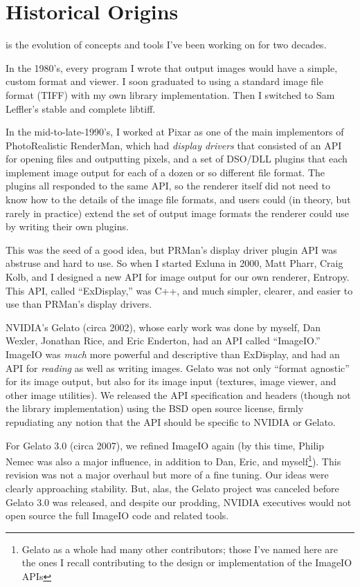 \section{Historical Origins}

\product is the evolution of concepts and tools I've been working on 
for two decades.

In the 1980's, every program I wrote that output images would have a
simple, custom format and viewer.  I soon graduated to using a standard
image file format (TIFF) with my own library implementation.  Then I
switched to Sam Leffler's stable and complete {\fn libtiff}.

In the mid-to-late-1990's, I worked at Pixar as one of the main
implementors of PhotoRealistic RenderMan, which had \emph{display
  drivers} that consisted of an API for opening files and outputting
pixels, and a set of DSO/DLL plugins that each implement image output
for each of a dozen or so different file format.  The plugins all
responded to the same API, so the renderer itself did not need to know
how to the details of the image file formats, and users could (in
theory, but rarely in practice) extend the set of output image formats
the renderer could use by writing their own plugins.

This was the seed of a good idea, but PRMan's display driver plugin API
was abstruse and hard to use.  So when I started Exluna in 2000, Matt
Pharr, Craig Kolb, and I designed a new API for image output for our own
renderer, Entropy.  This API, called ``ExDisplay,'' was C++, and much
simpler, clearer, and easier to use than PRMan's display drivers.

NVIDIA's Gelato (circa 2002), whose early work was done by myself, Dan
Wexler, Jonathan Rice, and Eric Enderton, had an API
called ``ImageIO.''  ImageIO was 
\emph{much} more powerful and descriptive than ExDisplay, and had an
API for \emph{reading} as well as writing images.  Gelato was not only
``format agnostic'' for its image output, but also for its
image input (textures, image viewer, and other image utilities).
We released the API specification and headers (though not the
library implementation) using the BSD open source license, firmly
repudiating any notion that the API should be specific to NVIDIA or
Gelato.

For Gelato 3.0 (circa 2007), we refined ImageIO again (by this time,
Philip Nemec was also a major influence, in addition to Dan, Eric, and
myself\footnote{Gelato as a whole had many other contributors; those
  I've named here are the ones I recall contributing to the design or
  implementation of the ImageIO APIs}).  This revision was not a major
overhaul but more of a fine tuning.  Our ideas were clearly approaching
stability.  But, alas, the Gelato project was canceled before Gelato 3.0
was released, and despite our prodding, NVIDIA executives would not open
source the full ImageIO code and related tools.

